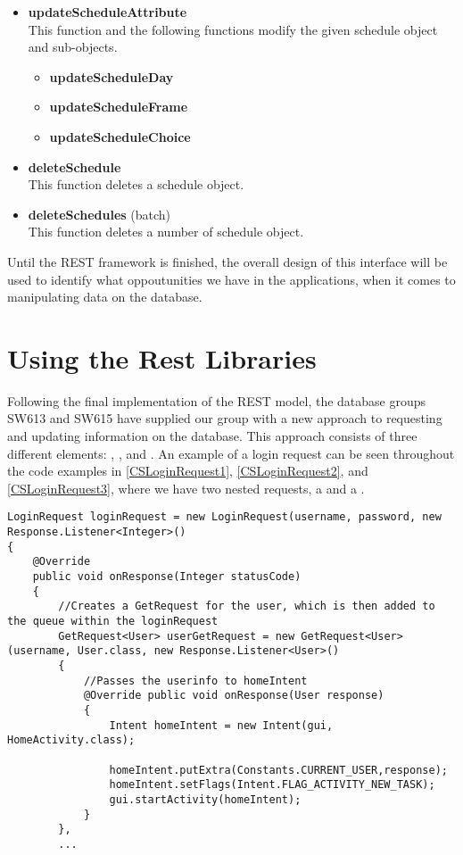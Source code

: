 \begin{itemize}
\begin{itemize}
    \end{itemize}
    \item \textbf{updateScheduleAttribute}\\
    This function and the following functions modify the given schedule object and sub-objects.
    \begin{itemize}
        \item \textbf{updateScheduleDay}
        \item \textbf{updateScheduleFrame}
        \item \textbf{updateScheduleChoice}
    \end{itemize}
    \item \textbf{deleteSchedule}\\
    This function deletes a schedule object.
    \item \textbf{deleteSchedules} (batch)\\
    This function deletes a number of schedule object.
\end{itemize}

Until the REST framework is finished, the overall design of this interface
will be used to identify what oppoutunities we have in the applications, when it
comes to manipulating data on the database.

\section{Using the Rest Libraries}\label{UsingRest}
Following the final implementation of the REST model, the database groups SW613
and SW615 have supplied our group with a new approach to requesting and updating
information on the database. This approach consists of three different
elements: , , and . An example of a login request can be seen throughout the code
examples in \autoref{CSLoginRequest1}, \autoref{CSLoginRequest2}, and
\autoref{CSLoginRequest3}, where we have two nested requests, a
 and a .\nl

\begin{minipage}[H]{\linewidth}
\begin{lstlisting}[caption = Initial request the the respective server response object, label = CSLoginRequest1]
LoginRequest loginRequest = new LoginRequest(username, password, new Response.Listener<Integer>() 
{
	@Override
    public void onResponse(Integer statusCode) 
    {
    	//Creates a GetRequest for the user, which is then added to the queue within the loginRequest 
    	GetRequest<User> userGetRequest = new GetRequest<User>(username, User.class, new Response.Listener<User>() 
    	{ 
    		//Passes the userinfo to homeIntent 
    		@Override public void onResponse(User response) 
    		{
	            Intent homeIntent = new Intent(gui, HomeActivity.class);
	            
                homeIntent.putExtra(Constants.CURRENT_USER,response);
                homeIntent.setFlags(Intent.FLAG_ACTIVITY_NEW_TASK);
                gui.startActivity(homeIntent);
            }
        },
        ...
\end{lstlisting}
\end{minipage}

